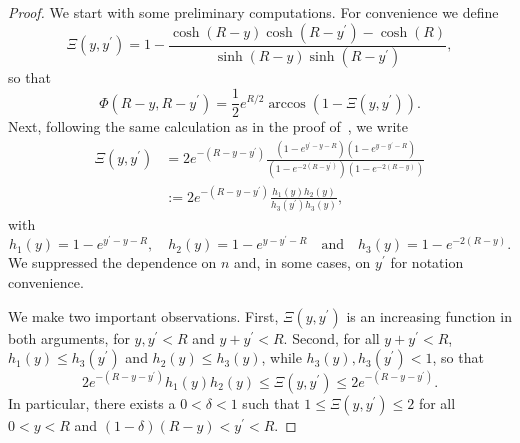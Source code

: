 \begin{proof}
We start with some preliminary computations. For convenience we define
\[
	\Xi(y,y^\prime) = 1 - \frac{\cosh(R- y)\cosh(R-y^\prime) - \cosh(R)}{\sinh(R - y) \sinh(R - y^\prime)},
\]
so that
\[
	\Phi(R -y, R - y^\prime) = \frac{1}{2}e^{R/2} \arccos\left(1 - \Xi(y,y^\prime)\right).
\]
Next, following the same calculation as in the proof of~\cite[Lemma 28]{fountoulakis2018law}, we write
\begin{align*}
	\Xi(y,y^\prime)
	&= 2 e^{-(R - y - y^\prime)} \frac{\left(1 - e^{y^\prime - y - R}\right)\left(1 - e^{y - y^\prime - R}\right)}
		{\left(1 - e^{-2(R - y^\prime)}\right)\left(1 - e^{-2(R- y)}\right)}\\
	&:= 2 e^{-(R - y - y^\prime)} \frac{h_1(y) h_2(y)}{h_3(y^\prime) h_3(y)},
\end{align*}
with
\[
	h_1(y) = 1 - e^{y^\prime - y - R}, \quad h_2(y) = 1 - e^{y - y^\prime - R}
	\quad \text{and} \quad h_3(y) = 1 - e^{-2(R- y)}.
\]
We suppressed the dependence on $n$ and, in some cases, on $y^\prime$ for notation convenience.

We make two important observations. First, $\Xi(y,y^\prime)$ is an increasing function in both arguments, for $y, y^\prime < R$ and $y + y^\prime < R$. Second, for all $y + y^\prime < R$, $h_1(y) \le h_3(y^\prime)$ and $h_2(y) \le h_3(y)$, while $h_3(y), h_3(y^\prime) < 1$, so that
\begin{equation}\label{eq:derivative_hyp_ball_Xi_bounds}
	2 e^{-(R - y - y^\prime)}h_1(y) h_2(y) \le \Xi(y,y^\prime) \le 2 e^{-(R - y - y^\prime)}.
\end{equation}
In particular, there exists a $0 < \delta < 1$ such that $1 \le \Xi(y,y^\prime) \le 2$ for all $0 < y < R$ and $(1-\delta)(R-y) < y^\prime < R$.


\end{proof}
